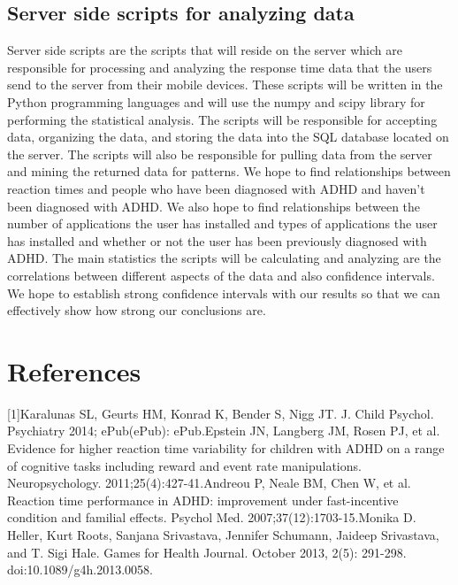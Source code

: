 \documentclass[a4wide]{article}
\begin{document}
\subsection{Server side scripts for analyzing data}
\- Server side scripts are the scripts that will reside on the server which are responsible for processing and analyzing the response time data that the users send to the server from their mobile devices. These scripts will be written in the Python programming languages and will use the numpy and scipy library for performing the statistical analysis. The scripts will be responsible for accepting data, organizing the data, and storing the data into the SQL database located on the server. The scripts will also be responsible for pulling data from the server and mining the returned data for patterns. We hope to find relationships between reaction times and people who have been diagnosed with ADHD and haven't been diagnosed with ADHD. We also hope to find relationships between the number of applications the user has installed and types of applications the user has installed and whether or not the user has been previously diagnosed with ADHD. The main statistics the scripts will be calculating and analyzing are the correlations between different aspects of the data and also confidence intervals. We hope to establish strong confidence intervals with our results so that we can effectively show how strong our conclusions are.

\section{References}
[1]Karalunas SL, Geurts HM, Konrad K, Bender S, Nigg JT. J. Child Psychol. Psychiatry 2014; ePub(ePub): ePub.\newline
[3] Epstein JN, Langberg JM, Rosen PJ, et al. Evidence for higher reaction time variability for children with ADHD on a range of cognitive tasks including reward and event rate manipulations. Neuropsychology. 2011;25(4):427-41.\newline
[4] Andreou P, Neale BM, Chen W, et al. Reaction time performance in ADHD: improvement under fast-incentive condition and familial effects. Psychol Med. 2007;37(12):1703-15.\newline
[5] Monika D. Heller, Kurt Roots, Sanjana Srivastava, Jennifer Schumann, Jaideep Srivastava, and T. Sigi Hale. Games for Health Journal. October 2013, 2(5): 291-298. doi:10.1089/g4h.2013.0058.\newline



\end{document}
